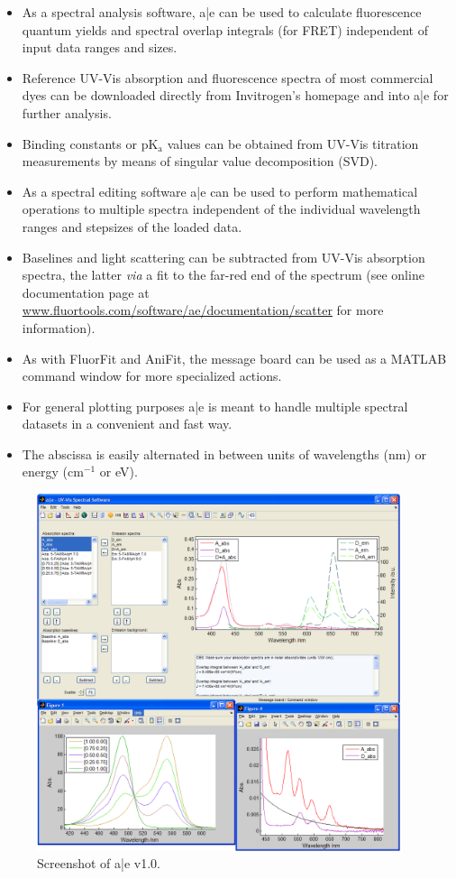 \begin{itemize}
  \item As a spectral analysis software, a|e can be used to calculate fluorescence quantum yields and spectral overlap integrals (for FRET) independent of input data ranges and sizes.
  \item Reference UV-Vis absorption and fluorescence spectra of most commercial dyes can be downloaded directly from Invitrogen's homepage and into a|e for further analysis.
  \item Binding constants or pK$_\mathrm{a}$ values can be obtained from UV-Vis titration measurements by means of singular value decomposition (SVD).
  \item As a spectral editing software a|e can be used to perform mathematical operations to multiple spectra independent of the individual wavelength ranges and stepsizes of the loaded data.
  \item Baselines and light scattering can be subtracted from UV-Vis absorption spectra, the latter \emph{via} a fit to the far-red end of the spectrum (see online documentation page at \url{www.fluortools.com/software/ae/documentation/scatter} for more information).
  \item As with FluorFit and AniFit, the message board can be used as a MATLAB command window for more specialized actions.
  \item For general plotting purposes a|e is meant to handle multiple spectral datasets in a convenient and fast way.
  \item The abscissa is easily alternated in between units of wavelengths (nm) or energy (cm$^{-1}$ or eV).
\end{itemize}

\begin{figure}
    \centering
        \includegraphics[width=0.95\textwidth]{adds//ae_fig.png}
    \captionsetup{width=.95\textwidth}
    \caption{Screenshot of a|e v1.0.}
    \label{Fig:chap_Papers_ae}
\end{figure}

